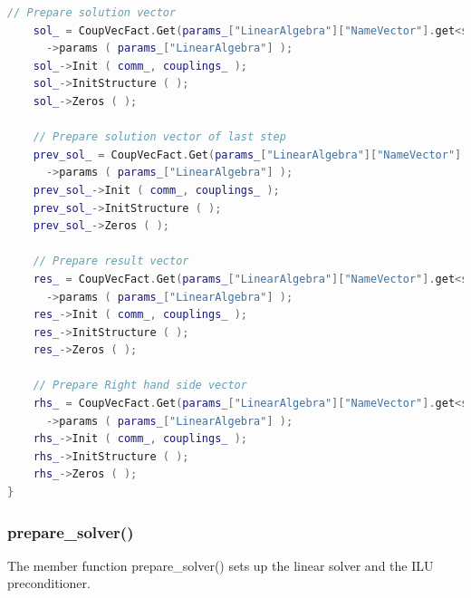 \documentclass[a4paper, 11pt, twoside]{article}
\begin{document}
\begin{lstlisting}[language=C++, basicstyle={\footnotesize, \ttfamily}, keywordstyle=\color{blue},  numbers=none, tabsize=4]
    // Prepare solution vector
    sol_ = CoupVecFact.Get(params_["LinearAlgebra"]["NameVector"].get<std::string>())
      ->params ( params_["LinearAlgebra"] );
    sol_->Init ( comm_, couplings_ );
    sol_->InitStructure ( );
    sol_->Zeros ( );

    // Prepare solution vector of last step
    prev_sol_ = CoupVecFact.Get(params_["LinearAlgebra"]["NameVector"].get<std::string>())
      ->params ( params_["LinearAlgebra"] );
    prev_sol_->Init ( comm_, couplings_ );
    prev_sol_->InitStructure ( );
    prev_sol_->Zeros ( );

    // Prepare result vector
    res_ = CoupVecFact.Get(params_["LinearAlgebra"]["NameVector"].get<std::string>())
      ->params ( params_["LinearAlgebra"] );
    res_->Init ( comm_, couplings_ );
    res_->InitStructure ( );
    res_->Zeros ( );

    // Prepare Right hand side vector
    rhs_ = CoupVecFact.Get(params_["LinearAlgebra"]["NameVector"].get<std::string>())
      ->params ( params_["LinearAlgebra"] );
    rhs_->Init ( comm_, couplings_ );
    rhs_->InitStructure ( );
    rhs_->Zeros ( );
}
\end{lstlisting}

\subsubsection{prepare\_solver()}
The member function prepare\_solver() sets up the linear solver and the ILU preconditioner.
\end{document}
